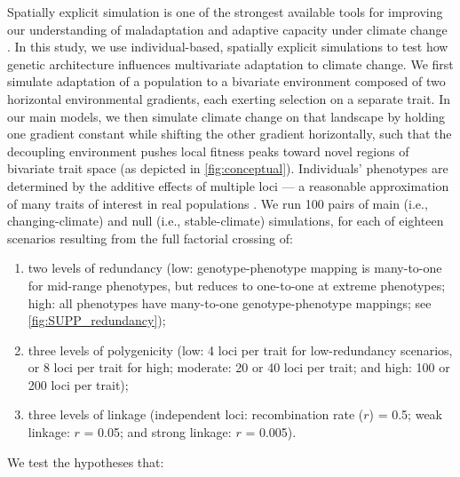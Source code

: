 \documentclass[9pt,twocolumn,twoside,lineno]{pnas-new}
\begin{document}
Spatially explicit simulation is one of the strongest available tools
for improving our understanding of maladaptation and adaptive capacity
under climate change \cite{capblancq_review}.
In this study, we use individual-based, spatially explicit simulations to test how genetic architecture influences multivariate adaptation to climate change.
We first simulate 
adaptation of a population to a bivariate environment composed of two horizontal 
environmental gradients, each exerting selection on a separate trait.
In our main models, we then simulate climate change on that landscape by holding one gradient 
constant while shifting the other gradient horizontally, such that
the decoupling environment pushes local fitness peaks toward novel regions 
of bivariate trait space (as depicted in \ref{fig:conceptual}).
Individuals' phenotypes are determined by the additive effects of multiple loci ---
a reasonable approximation of many traits of interest in real populations \cite{sella}.
We run 100 pairs of main (i.e., changing-climate)
and null (i.e., stable-climate) simulations, for each of eighteen scenarios
resulting from the full factorial crossing of:
\begin{enumerate}
    \item two levels of redundancy (low: genotype-phenotype mapping is many-to-one for mid-range phenotypes, but reduces to one-to-one at extreme phenotypes; high: all phenotypes have many-to-one genotype-phenotype mappings; see \ref{fig:SUPP_redundancy});
    \item three levels of polygenicity (low: 4 loci per trait for low-redundancy scenarios, or 8 loci per trait for high; moderate: 20 or 40 loci per trait; and high: 100 or 200 loci per trait);
    \item three levels of linkage (independent loci: recombination rate ($r$) = 0.5; weak linkage: $r$ = 0.05; and strong linkage: $r$ = 0.005).
\end{enumerate}
We test the hypotheses that:
\end{document}

